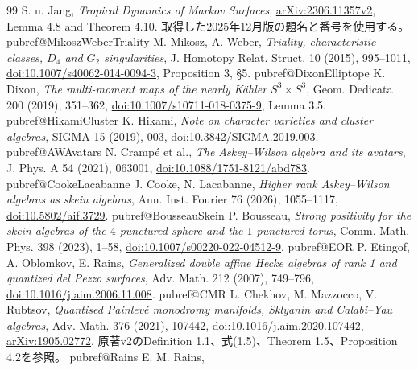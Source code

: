 \begin{thebibliography}{99}
 S. u. Jang,
\emph{Tropical Dynamics of Markov Surfaces},
\href{https://arxiv.org/abs/2306.11357v2}{arXiv:2306.11357v2},
Lemma 4.8 and Theorem 4.10. 取得した2025年12月版の題名と番号を使用する。
\fi
\ifcsname pubref@MikoszWeberTriality\endcsname
{} M. Mikosz, A. Weber,
\emph{Triality, characteristic classes, $D_4$ and $G_2$ singularities},
J. Homotopy Relat. Struct. 10 (2015), 995--1011,
\href{https://doi.org/10.1007/s40062-014-0094-3}{doi:10.1007/s40062-014-0094-3}, Proposition 3, \S5.
\fi
\ifcsname pubref@DixonElliptope\endcsname
{} K. Dixon,
\emph{The multi-moment maps of the nearly K\"ahler $S^3\times S^3$},
Geom. Dedicata 200 (2019), 351--362,
\href{https://doi.org/10.1007/s10711-018-0375-9}{doi:10.1007/s10711-018-0375-9}, Lemma 3.5.
\fi
\ifcsname pubref@HikamiCluster\endcsname
{} K. Hikami,
\emph{Note on character varieties and cluster algebras},
SIGMA 15 (2019), 003,
\href{https://doi.org/10.3842/SIGMA.2019.003}{doi:10.3842/SIGMA.2019.003}.
\fi
\ifcsname pubref@AWAvatars\endcsname
{} N. Cramp\'e et al.,
\emph{The Askey--Wilson algebra and its avatars},
J. Phys. A 54 (2021), 063001,
\href{https://doi.org/10.1088/1751-8121/abd783}{doi:10.1088/1751-8121/abd783}.
\fi
\ifcsname pubref@CookeLacabanne\endcsname
{} J. Cooke, N. Lacabanne,
\emph{Higher rank Askey--Wilson algebras as skein algebras},
Ann. Inst. Fourier 76 (2026), 1055--1117,
\href{https://doi.org/10.5802/aif.3729}{doi:10.5802/aif.3729}.
\fi
\ifcsname pubref@BousseauSkein\endcsname
{} P. Bousseau,
\emph{Strong positivity for the skein algebras of the $4$-punctured sphere and the $1$-punctured torus},
Comm. Math. Phys. 398 (2023), 1--58,
\href{https://doi.org/10.1007/s00220-022-04512-9}{doi:10.1007/s00220-022-04512-9}.
\fi
\ifcsname pubref@EOR\endcsname
{} P. Etingof, A. Oblomkov, E. Rains,
\emph{Generalized double affine Hecke algebras of rank 1 and quantized del Pezzo surfaces},
Adv. Math. 212 (2007), 749--796,
\href{https://doi.org/10.1016/j.aim.2006.11.008}{doi:10.1016/j.aim.2006.11.008}.
\fi
\ifcsname pubref@CMR\endcsname
{} L. Chekhov, M. Mazzocco, V. Rubtsov,
\emph{Quantised Painlev\'e monodromy manifolds, Sklyanin and Calabi--Yau algebras},
Adv. Math. 376 (2021), 107442,
\href{https://doi.org/10.1016/j.aim.2020.107442}{doi:10.1016/j.aim.2020.107442},
\href{https://arxiv.org/abs/1905.02772}{arXiv:1905.02772}.
原著v2のDefinition 1.1、式(1.5)、Theorem 1.5、Proposition 4.2を参照。
\fi
\ifcsname pubref@Rains\endcsname
{} E. M. Rains,

\end{thebibliography}
